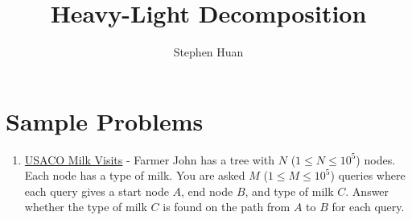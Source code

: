 \documentclass[11pt, oneside]{article}
\title{Heavy-Light Decomposition}
\author{Stephen Huan}
\begin{document}
\maketitle

\section{Sample Problems}

\begin{enumerate}
  \item \href{http://usaco.org/index.php?page=viewproblem2&cpid=970}{USACO Milk Visits} - Farmer John has a tree with \( N \) (\(1 \leq N \leq 10^5 \)) nodes.
  Each node has a type of milk. You are asked \( M \) (\(1 \leq M \leq 10^5 \)) queries where each query gives a start node \( A \), end node \( B \), and type of milk \( C \).
  Answer whether the type of milk \( C \) is found on the path from \( A \) to \( B \) for each query.


\end{enumerate}
\end{document}
